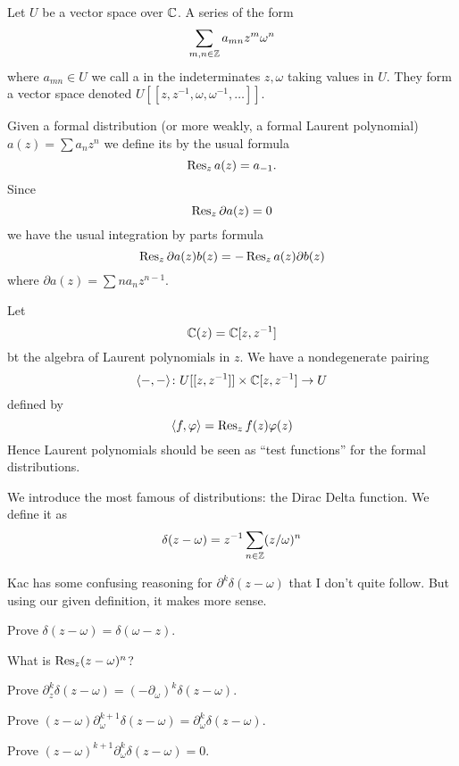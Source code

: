 \M
Let $U$ be a vector space over $\CC$. A series of the form
\begin{equation}
\sum_{m,n\in\ZZ}a_{mn}z^{m}\omega^{n}
\end{equation}
where $a_{mn}\in U$ we call a  in the
indeterminates $z,\omega$ taking values in $U$. They form a vector space
denoted $U[[z,z^{-1},\omega,\omega^{-1},\dots]]$. 

\M
Given a formal distribution (or more weakly, a formal Laurent polynomial)
$a(z) = \sum a_{n}z^{n}$ we define its  by the usual
formula
\begin{equation}
\Res[z]{a(z)} = a_{-1}.
\end{equation}
Since
\begin{equation}
\Res[z]{\partial a(z)}=0
\end{equation}
we have the usual integration by parts formula
\begin{equation}
\Res[z]{\partial a(z)b(z)}=-\Res[z]{a(z)\partial b(z)}
\end{equation}
where $\partial a(z)=\sum na_{n}z^{n-1}$.

\M
Let
\begin{equation}
\CC(z)=\CC[z,z^{-1}]
\end{equation}
bt the algebra of Laurent polynomials in $z$. We have a nondegenerate
pairing
\begin{equation}
\<-,-\>\colon U[[z,z^{-1}]]\times\CC[z,z^{-1}]\to U
\end{equation}
defined by
\begin{equation}
\<f,\varphi\>=\Res[z]{f(z)\varphi(z)}
\end{equation}
Hence Laurent polynomials should be seen as ``test functions'' for the
formal distributions.

\M
We introduce the most famous of distributions: the Dirac Delta
function. We define it as
\begin{equation}
\delta(z-\omega)
=z^{-1}\sum_{n\in\ZZ}(z/\omega)^{n}
\end{equation}
\begin{rmk}
Kac has some confusing reasoning for $\partial^{k}\delta(z-\omega)$ that
I don't quite follow. But using our given definition, it makes more sense.
\end{rmk}

\begin{xca}
Prove $\delta(z-\omega)=\delta(\omega-z)$.
\end{xca}
\begin{xca}
What is $\Res[z]{(z-\omega)^{n}}$?
\end{xca}
\begin{xca}
Prove $\partial^{k}_{z}\delta(z-\omega)=(-\partial_{\omega})^{k}\delta(z-\omega)$.
\end{xca}
\begin{xca}\label{xca:deltaDerivative}%
Prove $(z-\omega)\partial^{k+1}_{\omega}\delta(z-\omega)=\partial^{k}_{\omega}\delta(z-\omega)$.
\end{xca}
\begin{xca}\label{xca:usefulForCor3}%
Prove $(z-\omega)^{k+1}\partial^{k}_{\omega}\delta(z-\omega)=0$.
\end{xca}

